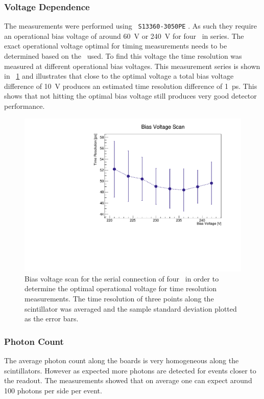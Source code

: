 \documentclass[../BTOF_summary.tex]{subfiles}
\begin{document}
\subsubsection*{Voltage Dependence}

The measurements were performed using \hamamatsu\ \texttt{S13360-3050PE} \sipms .
As such they require an operational bias voltage of around \SI{60}{V} or \SI{240}{V} for four \sipms\ in series.
The exact operational voltage optimal for timing measurements needs to be determined based on the \sipms\ used.
To find this voltage the time resolution was measured at different operational bias voltages.
This measurement series is shown in \fig~\ref{fig:BiasScan} and illustrates that close to the optimal voltage a total bias voltage difference of \SI{10}{V} produces an estimated time resolution difference of \SI{1}{ps}.
This shows that not hitting the optimal bias voltage still produces very good detector performance.

\begin{figure}[htbp]
    \centering 
    \includegraphics[width=.8\textwidth]{fig/BiasScan.pdf}
    \caption{Bias voltage scan for the serial connection of four \sipms\ in order to determine the optimal operational voltage for time resolution measurements. The time resolution of three points along the scintillator was averaged and the sample standard deviation plotted as the error bars.}
    \label{fig:BiasScan}
\end{figure}

\subsubsection*{Photon Count}

The average photon count along the boards is very homogeneous along the scintillators.
However as expected more photons are detected for events closer to the readout.
The measurements showed that on average one can expect around 100 photons per side per event.
\end{document}
